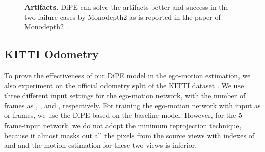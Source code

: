 \documentclass[letterpaper, 10 pt, conference]{ieeeconf}
\begin{document}
\begin{figure}
\centering
\hspace{-10pt}
\caption{{\bf Artifacts.} DiPE can solve the artifacts better and success in the two failure cases by Monodepth2 as is reported in the paper of Monodepth2 \cite{godard2019digging}. }
\vspace{-2pt}
\label{fig:artifacts}
\end{figure}


\subsection{KITTI Odometry}
To prove the effectiveness of our DiPE model in the ego-motion estimation, we also experiment on the official odometry split of the KITTI dataset \cite{geiger2013vision}. We use three different input settings for the ego-motion network, with the number of frames as , , and , respectively. For training the ego-motion network with input as  or  frames, we use the DiPE based on the baseline model. However, for the 5-frame-input network, we do not adopt the minimum reprojection technique, because it almost masks out all the pixels from the source views with indexes of  and  and the motion estimation for these two views is inferior. 
\end{document}
